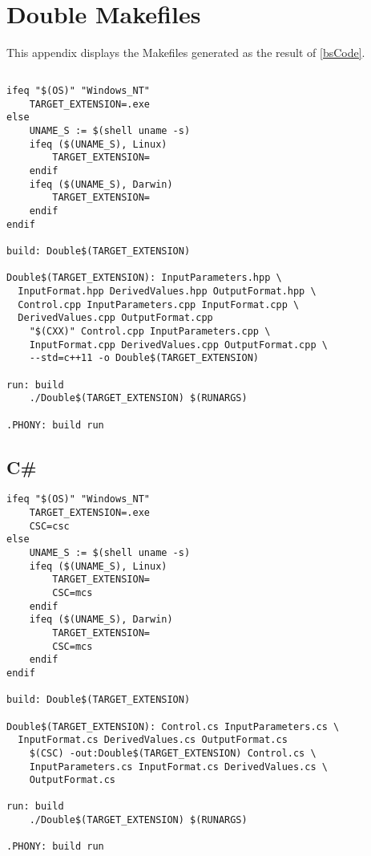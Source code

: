 \chapter{Double Makefiles}\label{a:doubleMakefiles}
This appendix displays the Makefiles generated as the result of \autoref{bsCode}.
\section{\CClb}\label{a:dm:cxx}
\begin{tcolorbox}[breakable, toprule at break=0pt, bottomrule at break=0pt]
\begin{verbatim}
ifeq "$(OS)" "Windows_NT"
    TARGET_EXTENSION=.exe
else
    UNAME_S := $(shell uname -s)
    ifeq ($(UNAME_S), Linux)
        TARGET_EXTENSION=
    endif
    ifeq ($(UNAME_S), Darwin)
        TARGET_EXTENSION=
    endif
endif

build: Double$(TARGET_EXTENSION)

Double$(TARGET_EXTENSION): InputParameters.hpp \
  InputFormat.hpp DerivedValues.hpp OutputFormat.hpp \
  Control.cpp InputParameters.cpp InputFormat.cpp \
  DerivedValues.cpp OutputFormat.cpp
	"$(CXX)" Control.cpp InputParameters.cpp \
	InputFormat.cpp DerivedValues.cpp OutputFormat.cpp \
	--std=c++11 -o Double$(TARGET_EXTENSION)

run: build
	./Double$(TARGET_EXTENSION) $(RUNARGS)

.PHONY: build run
\end{verbatim}
\end{tcolorbox}

\section{C\#}\label{a:dm:csharp}
\begin{tcolorbox}[breakable, toprule at break=0pt, bottomrule at break=0pt]
\begin{verbatim}
ifeq "$(OS)" "Windows_NT"
    TARGET_EXTENSION=.exe
    CSC=csc
else
    UNAME_S := $(shell uname -s)
    ifeq ($(UNAME_S), Linux)
        TARGET_EXTENSION=
        CSC=mcs
    endif
    ifeq ($(UNAME_S), Darwin)
        TARGET_EXTENSION=
        CSC=mcs
    endif
endif

build: Double$(TARGET_EXTENSION)

Double$(TARGET_EXTENSION): Control.cs InputParameters.cs \
  InputFormat.cs DerivedValues.cs OutputFormat.cs
	$(CSC) -out:Double$(TARGET_EXTENSION) Control.cs \
	InputParameters.cs InputFormat.cs DerivedValues.cs \
	OutputFormat.cs

run: build
	./Double$(TARGET_EXTENSION) $(RUNARGS)

.PHONY: build run

\end{verbatim}
\end{tcolorbox}

